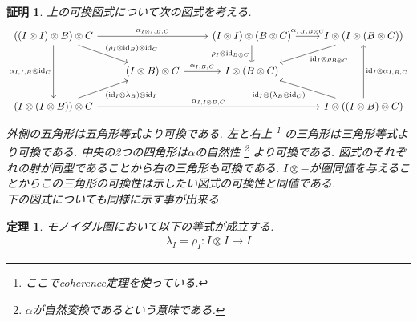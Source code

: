 \documentclass[a4paper,12pt]{ltjsarticle}
\theoremstyle{break}
\newtheorem{thrm}[thm]{定理}
\newtheorem*{prf}{証明}
\newcommand{\id}{\mathrm{id}}
\newcommand{\al}{\alpha}
\newcommand{\la}{\lambda}
\newcommand{\ot}{\otimes}
\numberwithin{equation}{section}
\begin{document}
\begin{prf}
  上の可換図式について次の図式を考える. 
  \[\begin{tikzcd}
    {((I \ot I) \ot B) \ot C} && {(I \ot I) \ot (B \ot C)} & {I \ot (I \ot (B \ot C))} \\
    & {(I \ot B) \ot C} & {I \ot (B \ot C)} \\
    {(I \ot (I \ot B)) \ot C} &&& {I \ot ((I \ot B) \ot C) }
    \arrow["{(\rho_I \ot \id_B) \ot \id_C}", from=1-1, to=2-2]
    \arrow["{\al_{I,I,B} \ot \id_C}"', from=1-1, to=3-1]
    \arrow["{(\id_I \ot \la_B) \ot \id_I}"', from=3-1, to=2-2]
    \arrow["{\al_{I,B,C}}", from=2-2, to=2-3]
    \arrow["{\al_{I \ot I,B,C}}", from=1-1, to=1-3]
    \arrow["{\rho_I \ot \id_{B \ot C}}"', from=1-3, to=2-3]
    \arrow["{\al_{I,I,B \ot C}}", from=1-3, to=1-4]
    \arrow["{\al_{I,I \ot B,C}}", from=3-1, to=3-4]
    \arrow["{\id_I \ot (\la_B \ot \id_C)}", from=3-4, to=2-3]
    \arrow["{\id_I \ot \al_{I,B,C}}"', from=3-4, to=1-4]
    \arrow["{\id_I \ot \rho_{B \ot C}}", from=1-4, to=2-3]
  \end{tikzcd}\]
  外側の五角形は五角形等式より可換である. 
  左と右上
  \footnote{
    ここでcoherence定理を使っている. 
  }
  の三角形は三角形等式より可換である. %
  中央の2つの四角形は$\al$の自然性
  \footnote{
    $\al$が自然変換であるという意味である. 
  }
  より可換である.
  図式のそれぞれの射が同型であることから右の三角形も可換である. 
  $I \ot -$が圏同値を与えることからこの三角形の可換性は示したい図式の可換性と同値である. \\
  下の図式についても同様に示す事が出来る. 
\end{prf}

\begin{thrm}
  モノイダル圏において以下の等式が成立する. 
  \begin{align*}
    \la_I =\rho_I :I \ot I \to I
  \end{align*}
\end{thrm}
\end{document}
